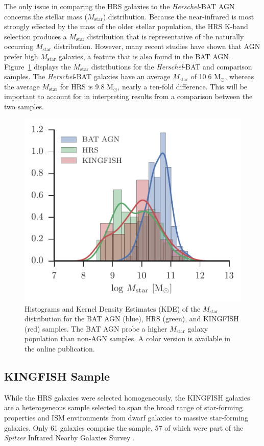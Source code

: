 \documentclass[fleqn,usenatbib]{mnras}
\newcommand{\herschel}{\emph{Herschel}}
\newcommand{\msun}{M$_{\odot}$}
\newcommand{\mstar}{$M_{\mathrm{star}}$}
\begin{document}
The only issue in comparing the HRS galaxies to the \herschel-BAT AGN concerns the stellar mass (\mstar) distribution. Because the near-infrared is most strongly effected by the mass of the older stellar population, the HRS K-band selection produces a \mstar{} distribution that is representative of the naturally occurring \mstar{} distribution. However, many recent studies have shown that AGN prefer high \mstar{} galaxies, a feature that is also found in the BAT AGN \citep{Koss:2011vn}. Figure~\ref{fig:mstar_dist} displays the \mstar{} distributions for the \herschel-BAT and comparison samples. The \herschel-BAT galaxies have an average \mstar{} of 10.6 \msun, whereas the average \mstar{} for HRS is 9.8 \msun, nearly a ten-fold difference. This will be important to account for in interpreting results from a comparison between the two samples.

\begin{figure}\label{fig:mstar_dist}
\includegraphics[width=\columnwidth]{figures/stellar_mass_comp}
\caption{Histograms and Kernel Density Estimates (KDE) of the \mstar{} distribution for the BAT AGN (blue), HRS (green), and KINGFISH (red) samples. The BAT AGN probe a higher \mstar{} galaxy population than non-AGN samples. A color version is available in the online publication.}
\end{figure}

\subsection{KINGFISH Sample}
While the HRS galaxies were selected homogeneously, the KINGFISH galaxies are a heterogeneous sample selected to span the broad range of star-forming properties and ISM environments from dwarf galaxies to massive star-forming galaxies. Only 61 galaxies comprise the sample, 57 of which were part of the \textit{Spitzer} Infrared Nearby Galaxies Survey \citep[SINGS;][]{Kennicutt:2003wk}.
\end{document}
